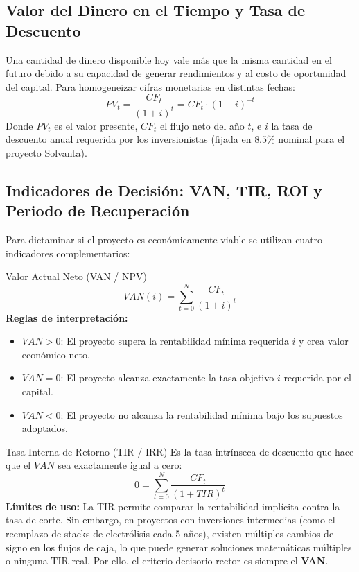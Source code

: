 \documentclass[11pt,letterpaper]{article}
\begin{document}
\subsection{Valor del Dinero en el Tiempo y Tasa de Descuento}
Una cantidad de dinero disponible hoy vale más que la misma cantidad en el futuro debido a su capacidad de generar rendimientos y al costo de oportunidad del capital. Para homogeneizar cifras monetarias en distintas fechas:
\begin{equation}
    PV_t = \frac{CF_t}{(1 + i)^t} = CF_t \cdot (1 + i)^{-t}
\end{equation}
Donde $PV_t$ es el valor presente, $CF_t$ el flujo neto del año $t$, e $i$ la tasa de descuento anual requerida por los inversionistas (fijada en $8.5\%$ nominal para el proyecto Solvanta).

\subsection{Indicadores de Decisión: VAN, TIR, ROI y Periodo de Recuperación}
Para dictaminar si el proyecto es económicamente viable se utilizan cuatro indicadores complementarios:

\begin{equationbox}{Valor Actual Neto (VAN / NPV)}
\begin{equation}
    VAN(i) = \sum_{t=0}^N \frac{CF_t}{(1 + i)^t}
\end{equation}
\textbf{Reglas de interpretación:}
\begin{itemize}
    \item $VAN > 0$: El proyecto supera la rentabilidad mínima requerida $i$ y crea valor económico neto.
    \item $VAN = 0$: El proyecto alcanza exactamente la tasa objetivo $i$ requerida por el capital.
    \item $VAN < 0$: El proyecto no alcanza la rentabilidad mínima bajo los supuestos adoptados.
\end{itemize}
\end{equationbox}

\begin{equationbox}{Tasa Interna de Retorno (TIR / IRR)}
Es la tasa intrínseca de descuento que hace que el $VAN$ sea exactamente igual a cero:
\begin{equation}
    0 = \sum_{t=0}^N \frac{CF_t}{(1 + TIR)^t}
\end{equation}
\textbf{Límites de uso:} La TIR permite comparar la rentabilidad implícita contra la tasa de corte. Sin embargo, en proyectos con inversiones intermedias (como el reemplazo de stacks de electrólisis cada 5 años), existen múltiples cambios de signo en los flujos de caja, lo que puede generar soluciones matemáticas múltiples o ninguna TIR real. Por ello, el criterio decisorio rector es siempre el \textbf{VAN}.
\end{equationbox}
\end{document}
